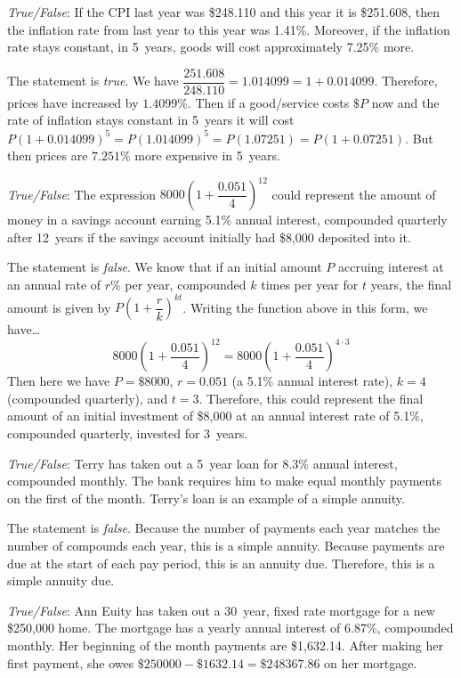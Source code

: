 \documentclass[11pt,letterpaper]{article}
\begin{document}
\quizsol \textit{True/False}: If the CPI last year was \$248.110 and this year it is \$251.608, then the inflation rate from last year to this year was 1.41\%. Moreover, if the inflation rate stays constant, in 5~years, goods will cost approximately 7.25\% more. \pspace

\sol The statement is \textit{true}. We have $\dfrac{251.608}{248.110}= 1.014099= 1 + 0.014099$. Therefore, prices have increased by $1.4099\%$. Then if a good/service costs $\$P$ now and the rate of inflation stays constant in 5~years it will cost $P(1 + 0.014099)^5= P(1.014099)^5= P(1.07251)= P(1 + 0.07251)$. But then prices are $7.251\%$ more expensive in 5~years. \pvspace{1.3cm}



\quizsol \textit{True/False}: The expression $8000 \left(1 + \dfrac{0.051}{4} \right)^{12}$ could represent the amount of money in a savings account earning 5.1\% annual interest, compounded quarterly after 12~years if the savings account initially had \$8,000 deposited into it. \pspace

\sol The statement is \textit{false}. We know that if an initial amount $P$ accruing interest at an annual rate of $r$\% per year, compounded $k$ times per year for $t$ years, the final amount is given by $P \left(1 + \dfrac{r}{k} \right)^{kt}$. Writing the function above in this form, we have\dots
	\[
	8000 \left(1 + \dfrac{0.051}{4} \right)^{12}= 8000 \left(1 + \dfrac{0.051}{4} \right)^{4 \cdot 3}
	\]
Then here we have $P= \$8000$, $r= 0.051$ (a 5.1\% annual interest rate), $k= 4$ (compounded quarterly), and $t= 3$. Therefore, this could represent the final amount of an initial investment of \$8,000 at an annual interest rate of 5.1\%, compounded quarterly, invested for 3~years. \pvspace{1.3cm}



\quizsol \textit{True/False}: Terry has taken out a 5~year loan for 8.3\% annual interest, compounded monthly. The bank requires him to make equal monthly payments on the first of the month. Terry's loan is an example of a simple annuity. \pspace

\sol The statement is \textit{false}. Because the number of payments each year matches the number of compounds each year, this is a simple annuity. Because payments are due at the start of each pay period, this is an annuity due. Therefore, this is a simple annuity due. \pvspace{1.3cm}



\quizsol \textit{True/False}: Ann Euity has taken out a 30~year, fixed rate mortgage for a new \$250,000 home. The mortgage has a yearly annual interest of 6.87\%, compounded monthly. Her beginning of the month payments are \$1,632.14. After making her first payment, she owes $\$250000 - \$1632.14= \$248367.86$ on her mortgage. \pspace
\end{document}
